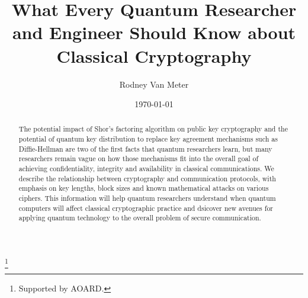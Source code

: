 \documentclass[%
 aip,
 jmp,%
 amsmath,amssymb,
 reprint,%
]{revtex4-1}
\def\comment#1{{\color{ForestGreen}$\Rightarrow${\small\em #1}}}
\begin{document}

\title[What Crypto]{What Every Quantum Researcher and Engineer Should Know about Classical Cryptography}%
\thanks{Supported by AOARD.}

\author{Rodney Van Meter}
%

\date{\today}%

\begin{abstract}
  The potential impact of Shor's factoring algorithm on public key
  cryptography and the potential of quantum key distribution to
  replace key agreement mechanisms such as Diffie-Hellman are two of
  the first facts that quantum researchers learn, but many researchers
  remain vague on how those mechanisms fit into the overall goal of
  achieving confidentiality, integrity and availability in classical
  communications.  We describe the relationship between cryptography
  and communication protocols, with emphasis on key lengths, block
  sizes and known mathematical attacks on various ciphers.  This
  information will help quantum researchers understand when quantum
  computers will affect classical cryptographic practice and dsicover
  new avenues for applying quantum technology to the overall problem
  of secure communication.
%
\end{abstract}

\maketitle

\tableofcontents{}
\end{document}
